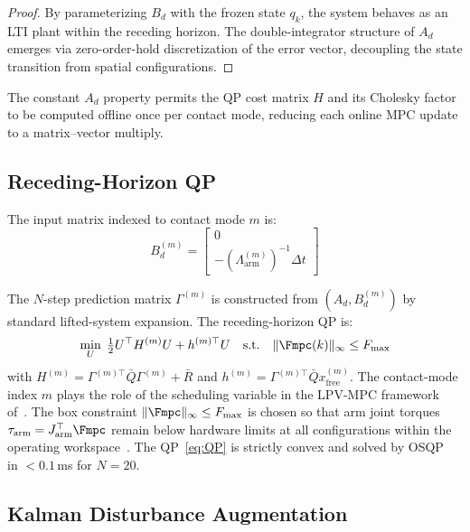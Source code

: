 \begin{proof}
By parameterizing $B_d$ with the frozen state $q_k$, the system behaves as
an LTI plant within the receding horizon.
The double-integrator structure of $A_d$ emerges via zero-order-hold
discretization of the error vector, decoupling the state transition from
spatial configurations.
\end{proof}

The constant $A_d$ property permits the QP cost matrix $H$ and its Cholesky
factor to be computed offline once per contact mode, reducing each online
MPC update to a matrix--vector multiply.

\subsection{Receding-Horizon QP}

The input matrix indexed to contact mode $m$ is:
\begin{equation}\label{eq:Bd}
  B_d^{(m)} = \begin{bmatrix}0 \\ -(\Lambda_{\text{arm}}^{(m)})^{-1}\Delta t\end{bmatrix}
\end{equation}

The $N$-step prediction matrix $\Gamma^{(m)}$ is constructed from
$(A_d,B_d^{(m)})$ by standard lifted-system expansion.
The receding-horizon QP is:
\begin{equation}\label{eq:QP}
  \min_{U}\;\tfrac{1}{2}U^\top H^{(m)}U + h^{(m)\top}U
  \quad\text{s.t.}\quad \|\Fmpc(k)\|_\infty\leq F_{\max}
\end{equation}
with $H^{(m)}=\Gamma^{(m)\top}\bar{Q}\Gamma^{(m)}+\bar{R}$ and
$h^{(m)}=\Gamma^{(m)\top}\bar{Q}x_{\text{free}}^{(m)}$.
The contact-mode index $m$ plays the role of the scheduling variable in the
LPV-MPC framework of~\cite{cao2005minmax}.
The box constraint $\|\Fmpc\|_\infty\leq F_{\max}$ is chosen so that arm
joint torques $\tau_{\text{arm}}=J_{\text{arm}}^\top\Fmpc$ remain below
hardware limits at all configurations within the operating
workspace~\cite{cao2002antiwindup}.
The QP~\eqref{eq:QP} is strictly convex and solved by OSQP~\cite{stellato2020osqp}
in $<0.1$\,ms for $N=20$.

\subsection{Kalman Disturbance Augmentation}

